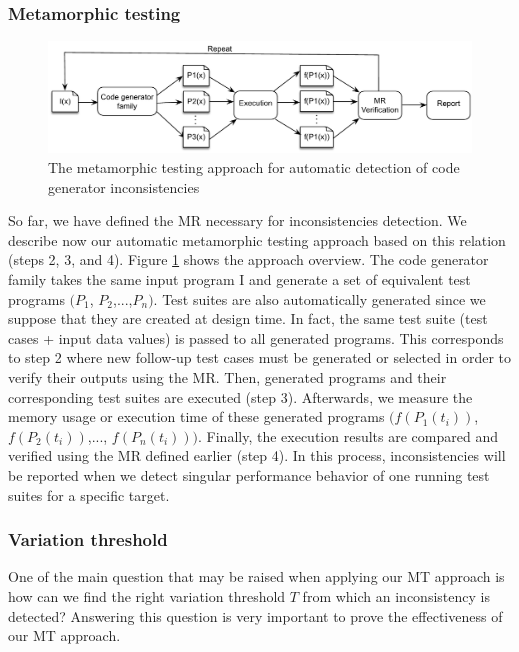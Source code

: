 \subsubsection[(Steps 2, 3, and 4)]{Metamorphic testing}
\label{sec:cg-Metamorphic testing}
\begin{figure}[h]
	\centering
	\includegraphics[width=1.\linewidth]{chapitre4/fig/MT}
	\caption{The metamorphic testing approach for automatic detection of code generator inconsistencies}
	\label{fig:cg_MT}
\end{figure}

So far, we have defined the MR necessary for inconsistencies detection. We describe now our automatic metamorphic testing approach based on this relation (steps 2, 3, and 4). 
Figure \ref{fig:cg_MT} shows the approach overview.
The code generator family takes the same input program I and generate a set of equivalent test programs $(P_{1}$, $P_{2}$,...,$P_{n})$. Test suites are also automatically generated since we suppose that they are created at design time. In fact, the same test suite (test cases + input data values) is passed to all generated programs. This corresponds to step 2 where new follow-up test cases must be generated or selected in order to verify their outputs using the MR. 
Then, generated programs and their corresponding test suites are executed (step 3). Afterwards, we measure the memory usage or execution time of these generated programs $(f(P_{1}(t_{i}))$, $f(P_{2}(t_{i}))$,..., $f(P_{n}(t_{i})))$. Finally, the execution results are compared and verified using the MR defined earlier (step 4).
In this process, inconsistencies will be reported when we detect singular performance behavior of one running test suites for a specific target.





\subsubsection{Variation threshold}
\label{sec:cg-Variation threshold}
One of the main question that may be raised when applying our MT approach is how can we find the right variation threshold $T$ from which an inconsistency is detected? Answering this question is very important to prove the effectiveness of our MT approach.

